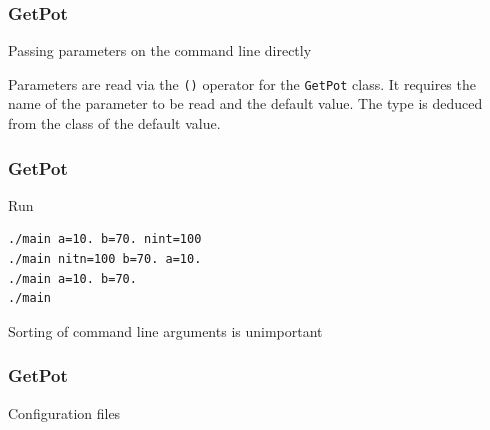 \documentclass[smaller,a4paper]{beamer}
\begin{document}
\begin{frame}[fragile]

    \frametitle{GetPot}

    \begin{block}{Passing parameters on the command line directly}
        \lstset{basicstyle=\scriptsize\sf}
            
        \lstset{basicstyle=\sf}
    \end{block}

    \vspace{.2cm}

    \begin{block}{ }
    Parameters are read via the \texttt{()} operator for the \texttt{GetPot} class.
    It requires the name of the parameter to be read and the default value.
    The type is deduced from the class of the default value.
    \end{block}

\end{frame}


\begin{frame}[fragile]

    \frametitle{GetPot}

        \begin{block}{Run}
            \begin{verbatim}
./main a=10. b=70. nint=100
./main nitn=100 b=70. a=10.
./main a=10. b=70.
./main
            \end{verbatim}
        \end{block}

    \begin{block}{ }
    	Sorting of command line arguments is unimportant    
    \end{block}

\end{frame}


\begin{frame}[fragile]

    \frametitle{GetPot}

    \begin{block}{Configuration files}
        
    \end{block}

\end{frame}
\end{document}
